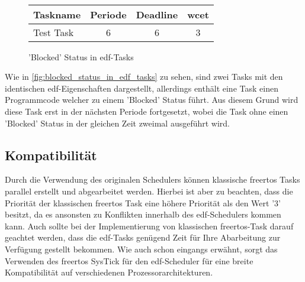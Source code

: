 \documentclass[../EDF Master Thesis.tex]{subfiles}
\begin{document}
\begin{figure}[H]
\\

        \vspace {0.5cm}
        \begin{tabular}{l|c|c|c}
            Taskname & Periode & Deadline & \ac{wcet} \\
            \hline
            Test Task & 6 & 6 & 3 \\
        \end{tabular}
        \caption{'Blocked' Status in \ac{edf}-Tasks}
        \label{fig:blocked_status_in_edf_tasks}
    \end{figure}

    Wie in \autoref{fig:blocked_status_in_edf_tasks} zu sehen, sind zwei Tasks mit den identischen \ac{edf}-Eigenschaften dargestellt, allerdings enthält eine Task einen Programmcode welcher zu einem 'Blocked' Status führt.
    Aus diesem Grund wird diese Task erst in der nächsten Periode fortgesetzt, wobei die Task ohne einen 'Blocked' Status in der gleichen Zeit zweimal ausgeführt wird.


\subsection{Kompatibilität}

    Durch die Verwendung des originalen Schedulers können klassische \ac{freertos} Tasks parallel erstellt und abgearbeitet werden.
    Hierbei ist aber zu beachten, dass die Priorität der klassischen \ac{freertos} Task eine höhere Priorität als den Wert '3' besitzt, da es ansonsten zu Konflikten innerhalb des \ac{edf}-Schedulers kommen kann.
    Auch sollte bei der Implementierung von klassischen \ac{freertos}-Task darauf geachtet werden, dass die \ac{edf}-Tasks genügend Zeit für Ihre Abarbeitung zur Verfügung gestellt bekommen.
    Wie auch schon eingangs erwähnt, sorgt das Verwenden des \ac{freertos} SysTick für den \ac{edf}-Scheduler für eine breite Kompatibilität auf verschiedenen Prozessorarchitekturen.
\end{document}
